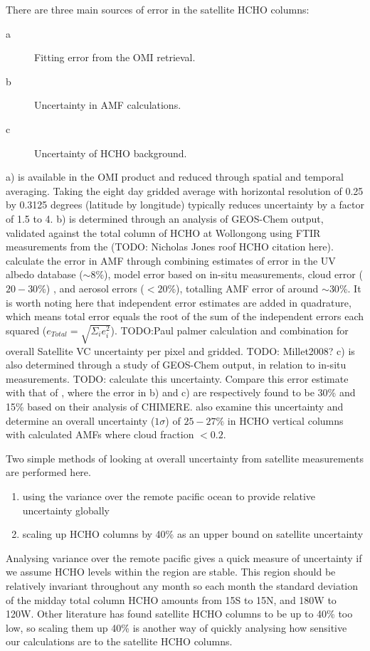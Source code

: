     There are three main sources of error in the satellite HCHO columns:
    \begin{description}
      \item[a] Fitting error from the OMI retrieval.
      \item[b] Uncertainty in AMF calculations.
      \item[c] Uncertainty of HCHO background.
    \end{description}
    a) is available in the OMI product and reduced through spatial and temporal averaging.
    Taking the eight day gridded average with horizontal resolution of 0.25 by 0.3125 degrees (latitude by longitude) typically reduces uncertainty by a factor of 1.5 to 4.
    b) is determined through an analysis of GEOS-Chem output, validated against the total column of HCHO at Wollongong using FTIR measurements from the (TODO: Nicholas Jones roof HCHO citation here).
    \textcite{Palmer2006} calculate the error in AMF through combining estimates of error in the UV albedo database ($\sim 8$\%), model error based on in-situ measurements, cloud error  ($20-30$\%) \parencite{Martin2003}, and aerosol errors ($<20$\%), totalling AMF error of around $\sim 30$\%.
    It is worth noting here that independent error estimates are added in quadrature, which means total error equals the root of the sum of the independent errors each squared ($e_{Total}=\sqrt{\Sigma_i e_i^2}$).
    TODO:Paul palmer calculation and combination for overall Satellite VC uncertainty per pixel and gridded.
    TODO: Millet2008?
    c) is also determined through a study of GEOS-Chem output, in relation to in-situ measurements.
    TODO: calculate this uncertainty.
    Compare this error estimate with that of \textcite{Curci2010}, where the error in b) and c) are respectively found to be 30\% and 15\% based on their analysis of CHIMERE.
    \textcite{Millet2008} also examine this uncertainty and determine an overall uncertainty ($1\sigma$) of $25-27\%$ in HCHO vertical columns with calculated AMFs where cloud fraction $< 0.2$.
    
    
    Two simple methods of looking at overall uncertainty from satellite measurements are performed here.
    \begin{enumerate}
      \item using the variance over the remote pacific ocean to provide relative uncertainty globally \parencite[e.g.][]{DeSmedt2012}
      \item scaling up HCHO columns by 40\% as an upper bound on satellite uncertainty
    \end{enumerate}
    Analysing variance over the remote pacific gives a quick measure of uncertainty if we assume HCHO levels within the region are stable.
    This region should be relatively invariant throughout any month so each month the standard deviation of the midday total column HCHO amounts from 15\degr S to 15\degr N, and 180\degr W to 120\degr W.
    Other literature has found satellite HCHO columns to be up to 40\% too low, so scaling them up 40\% is another way of quickly analysing how sensitive our calculations are to the satellite HCHO columns.
    
